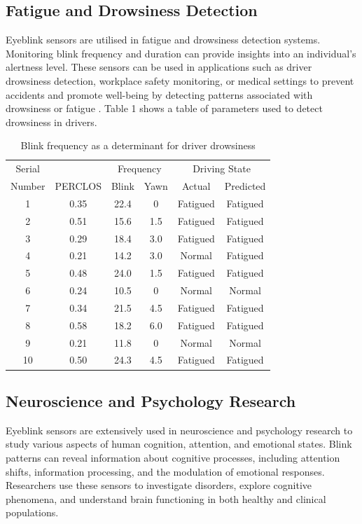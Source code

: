 \documentclass[conference]{IEEEtran}
\begin{document}
\subsection{Fatigue and Drowsiness Detection}
    Eyeblink sensors are utilised in fatigue and drowsiness detection systems. Monitoring blink frequency and duration can provide insights into an individual's alertness level.  These sensors can be used in applications such as driver drowsiness detection, workplace safety monitoring, or medical settings to prevent accidents and promote well-being by detecting patterns associated with drowsiness or fatigue \cite{fatigue} \cite{drowsiness detection} \cite{sleep apnoea}. Table 1 shows a table of parameters used to detect drowsiness in drivers. 
\begin{table}[bfdriver]
\caption{Blink frequency as a determinant for driver drowsiness}
\begin{center}
\begin{tabular}{|c|c|c|c|c|c|}
\hline
Serial & & \multicolumn{2}{|c|}{Frequency} & \multicolumn{2}{|c|}{Driving State} \\
\cline{3-6}
Number & PERCLOS & Blink & Yawn & Actual & Predicted \\
\hline
1 & 0.35 & 22.4 & 0 & Fatigued & Fatigued \\
2 & 0.51 & 15.6 & 1.5 & Fatigued & Fatigued \\
3 & 0.29 & 18.4 & 3.0 & Fatigued & Fatigued \\
4 & 0.21 & 14.2 & 3.0 & Normal & Fatigued \\
5 & 0.48 & 24.0 & 1.5 & Fatigued & Fatigued \\
6 & 0.24 & 10.5 & 0 & Normal & Normal \\
7 & 0.34 & 21.5 & 4.5 & Fatigued & Fatigued \\
8 & 0.58 & 18.2 & 6.0 & Fatigued & Fatigued \\
9 & 0.21 & 11.8 & 0 & Normal & Normal \\
10 & 0.50 & 24.3 & 4.5 & Fatigued & Fatigued \\
\hline
\end{tabular}
\end{center}
\end{table}

\subsection{Neuroscience and Psychology Research}
Eyeblink sensors are extensively used in neuroscience and psychology research to study various aspects of human cognition, attention, and emotional states. Blink patterns can reveal information about cognitive processes, including attention shifts, information processing, and the modulation of emotional responses. Researchers use these sensors to investigate disorders, explore cognitive phenomena, and understand brain functioning in both healthy and clinical populations.
\end{document}
